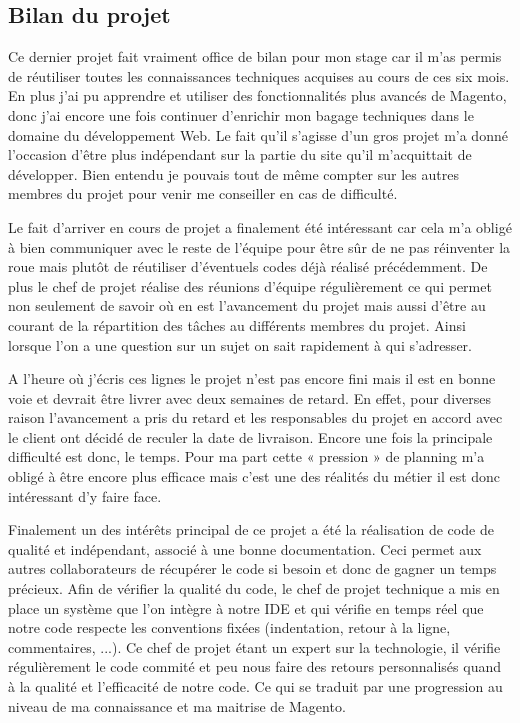 \documentclass[a4paper,11pt,twoside]{report}
\begin{document}
    \subsection*{Bilan du projet}
    Ce dernier projet fait vraiment office de bilan pour mon stage car il m'as permis de réutiliser toutes les connaissances techniques acquises au cours de ces six mois. En plus j'ai pu apprendre et utiliser des fonctionnalités plus avancés de Magento, donc j'ai encore une fois continuer d'enrichir mon bagage techniques dans le domaine du développement Web. Le fait qu'il s'agisse d'un gros projet m'a donné l'occasion d'être plus indépendant sur la partie du site qu'il m'acquittait de développer. Bien entendu je pouvais tout de même compter sur les autres membres du projet pour venir me conseiller en cas de difficulté.
    
    Le fait d'arriver en cours de projet a finalement été intéressant car cela m'a obligé à bien communiquer avec le reste de l'équipe pour être sûr de ne pas réinventer la roue mais plutôt de réutiliser d'éventuels codes déjà réalisé précédemment. De plus le chef de projet réalise des réunions d'équipe régulièrement ce qui permet non seulement de savoir où en est l'avancement du projet mais aussi d'être au courant de la répartition des tâches au différents membres du projet. Ainsi lorsque l'on a une question sur un sujet on sait rapidement à qui s'adresser. 
    
    A l'heure où j'écris ces lignes le projet n'est pas encore fini mais il est en bonne voie et devrait être livrer avec deux semaines de retard. En effet, pour diverses raison l'avancement a pris du retard et les responsables du projet en accord avec le client ont décidé de reculer la date de livraison. Encore une fois la principale difficulté est donc, le temps. Pour ma part cette « pression » de planning m'a obligé à être encore plus efficace mais c'est une des réalités du métier il est donc intéressant d'y faire face. 
    
    Finalement un des intérêts principal de ce projet a été la réalisation de code de qualité et indépendant, associé à une bonne documentation. Ceci permet aux autres collaborateurs de récupérer le code si besoin et donc de gagner un temps précieux. Afin de vérifier la qualité du code, le chef de projet technique a mis en place un système que l'on intègre à notre IDE et qui vérifie en temps réel que notre code respecte les conventions fixées (indentation, retour à la ligne, commentaires, ...). Ce chef de projet étant un expert sur la technologie, il vérifie régulièrement le code commité et peu nous faire des retours personnalisés quand à la qualité et l'efficacité de notre code. Ce qui se traduit par une progression au niveau de ma connaissance et ma maitrise de Magento. 
   
\end{document}
